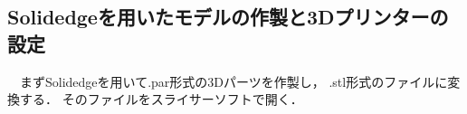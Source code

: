 \begin{center}
\section*{}                      %
\vspace*{-2zh}
\end{center}


\subsection{Solidedgeを用いたモデルの作製と3Dプリンターの設定}
　まずSolidedgeを用いて.par形式の3Dパーツを作製し，
.stl形式のファイルに変換する．
そのファイルをスライサーソフトで開く．

